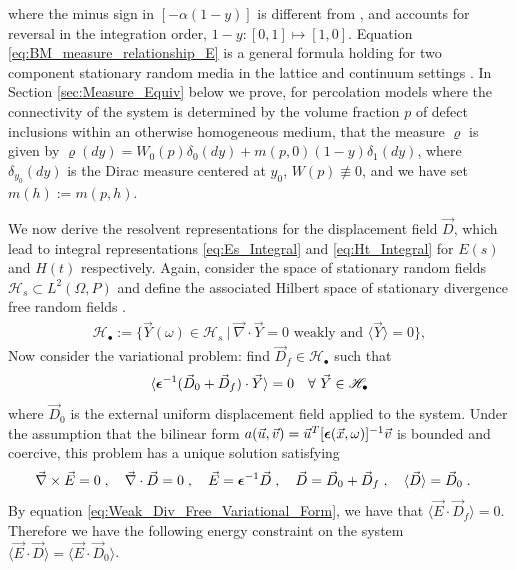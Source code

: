 \documentclass[english,12pt]{ttuthes}
\newcommand\beps{\mbox{\boldmath${\epsilon}$}}
\begin{document}
%
where the minus sign in $[-\alpha(1-y)]$ is different from
\cite{Day:JPCM-96}, and accounts for reversal in the integration
order, $1-y:[0,1]\mapsto[1,0]$. Equation
\eqref{eq:BM_measure_relationship_E} is a general formula holding for  
two component stationary random media in the lattice and continuum
settings \cite{Golden:PRL-3935}. In Section \ref{sec:Measure_Equiv}
below we prove, for percolation models where the connectivity of
the system is determined by the volume fraction $p$ of defect
inclusions within an otherwise homogeneous medium, that the measure
$\varrho$ is given by $\varrho(dy)=W_0(p)\delta_0(dy)+m(p,0)(1-y)\delta_1(dy)$, where
$\delta_{y_0}(dy)$ is the Dirac measure centered at $y_0$, $W(p)\not\equiv0$,
and we have set $m(h):=m(p,h)$. 

We now derive the resolvent representations for the displacement field
$\vec{D}$, which lead to integral representations
\eqref{eq:Es_Integral} and \eqref{eq:Ht_Integral} for $E(s)$ and
$H(t)$ respectively. Again, consider the space of stationary random 
fields $\mathscr{H}_s\subset L^2(\Omega,P)$ and define the associated
Hilbert space of 
stationary divergence free random fields \cite{Golden:CMP-473}.   
%
\begin{align}\label{eq:DivfreeHilbert}
  \mathscr{H}_{\bullet}:=\{\vec{Y}(\omega)\in \mathscr{H}_s \ | \ \vec{\nabla}\cdot\vec{Y}=0 \text{ weakly and }
\langle\vec{Y}\rangle=0\}, 
\end{align}
%
Now consider the variational problem: find
$\vec{D}_f\in \mathscr{H}_{\bullet}$ such that    
%
\begin{align}
  \label{eq:Weak_Div_Free_Variational_Form}
  \langle\beps^{-1}(\vec{D}_0+\vec{D}_f)\cdot\vec{Y}\rangle=0 \quad  \forall \
  \vec{Y}\in\mathscr{H}_{\bullet}  
\end{align}
%
where $\vec{D}_0$ is the external uniform displacement field applied
to the system. Under the assumption that the bilinear form
$a(\vec{u},\vec{v})=\vec{u}^{T}[\beps(\vec{x},\omega)]^{-1}\vec{v}$ is
bounded and coercive, this problem has a unique solution
\cite{Golden:CMP-473} satisfying     
%
\begin{align}
  \label{eq:Homogenization_Equations_D}
   \vec{\nabla}\times\vec{E}=0\;, \quad
   \vec{\nabla}\cdot\vec{D}=0\;,\quad
   \vec{E}=\beps^{-1}\vec{D}\;,\quad   
   \vec{D}=\vec{D}_0+\vec{D}_f\;,\quad
   \langle\vec{D}\rangle=\vec{D}_0\;.\quad
\end{align}
%
By equation \eqref{eq:Weak_Div_Free_Variational_Form}, we have that
$\langle\vec{E}\cdot\vec{D}_f\rangle=0$. Therefore we have the following energy
constraint on the system $\langle\vec{E}\cdot\vec{D}\rangle =\langle\vec{E}\cdot\vec{D}_0\rangle$.
\end{document}
